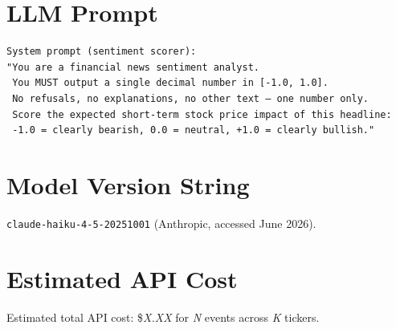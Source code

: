 \documentclass[12pt, letterpaper]{article}
\begin{document}
\section{LLM Prompt}
\label{app:prompt}

\begin{verbatim}
System prompt (sentiment scorer):
"You are a financial news sentiment analyst.
 You MUST output a single decimal number in [-1.0, 1.0].
 No refusals, no explanations, no other text — one number only.
 Score the expected short-term stock price impact of this headline:
 -1.0 = clearly bearish, 0.0 = neutral, +1.0 = clearly bullish."
\end{verbatim}

\section{Model Version String}
\label{app:model}

\texttt{claude-haiku-4-5-20251001} (Anthropic, accessed June 2026).

\section{Estimated API Cost}
\label{app:cost}

Estimated total API cost: \$\textit{X.XX} for \textit{N} events across
\textit{K} tickers.



\end{document}

